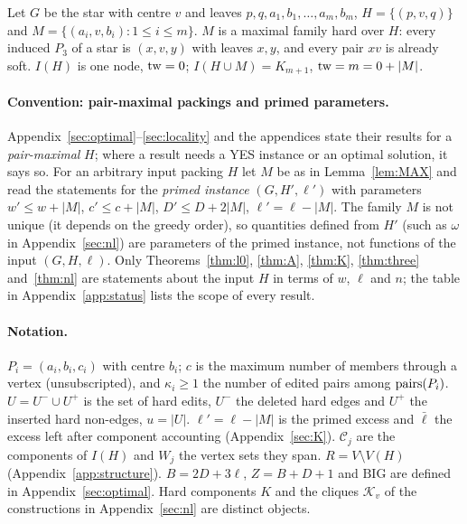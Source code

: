 \begin{example}\label{ex:maxtight}
Let $G$ be the star with centre $v$ and leaves $p,q,a_1,b_1,\dots,a_m,b_m$, $H=\{(p,v,q)\}$ and $M=\{(a_i,v,b_i):1\le i\le m\}$. $M$ is a maximal family hard over $H$: every induced $P_3$ of a star is $(x,v,y)$ with leaves $x,y$, and every pair $xv$ is already soft. $I(H)$ is one node, $\mathrm{tw}=0$; $I(H\cup M)=K_{m+1}$, $\mathrm{tw}=m=0+|M|$.
\end{example}

\paragraph{Convention: pair-maximal packings and primed parameters.}
Appendix~\ref{sec:optimal}--\ref{sec:locality} and the appendices state their results for a \emph{pair-maximal} $H$; where a result needs a YES instance or an optimal solution, it says so. For an arbitrary input packing $H$ let $M$ be as in Lemma~\ref{lem:MAX} and read the statements for the \emph{primed instance} $(G,H',\ell')$ with parameters $w'\le w+|M|$, $c'\le c+|M|$, $D'\le D+2|M|$, $\ell'=\ell-|M|$. The family $M$ is not unique (it depends on the greedy order), so quantities defined from $H'$ (such as $\omega$ in Appendix~\ref{sec:nl}) are parameters of the primed instance, not functions of the input $(G,H,\ell)$. Only Theorems~\ref{thm:l0}, \ref{thm:A}, \ref{thm:K}, \ref{thm:three} and~\ref{thm:nl} are statements about the input $H$ in terms of $w$, $\ell$ and $n$; the table in Appendix~\ref{app:status} lists the scope of every result.

\paragraph{Notation.}
$P_i=(a_i,b_i,c_i)$ with centre $b_i$; $c$ is the maximum number of members through a vertex (unsubscripted), and $\kappa_i\ge1$ the number of edited pairs among $\mathrm{pairs}(P_i)$. $U=U^-\cup U^+$ is the set of hard edits, $U^-$ the deleted hard edges and $U^+$ the inserted hard non-edges, $u=|U|$. $\ell'=\ell-|M|$ is the primed excess and $\bar\ell$ the excess left after component accounting (Appendix~\ref{sec:K}). $\mathcal C_j$ are the components of $I(H)$ and $W_j$ the vertex sets they span. $R=V\setminus V(H)$ (Appendix~\ref{app:structure}). $B=2D+3\ell$, $Z=B+D+1$ and $\mathrm{BIG}$ are defined in Appendix~\ref{sec:optimal}. Hard components $K$ and the cliques $\mathcal K_v$ of the constructions in Appendix~\ref{sec:nl} are distinct objects.
